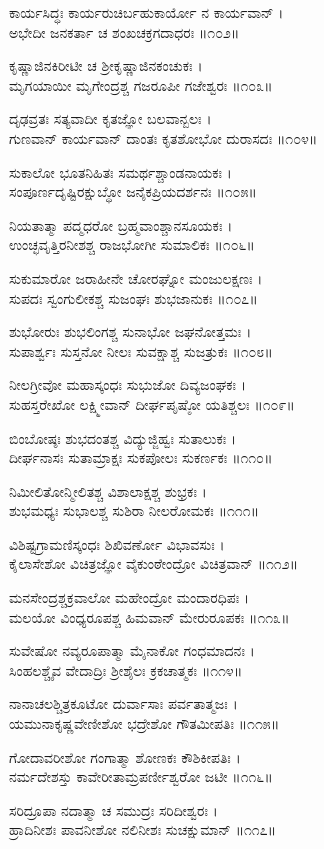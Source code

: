 ಕಾರ್ಯಸಿದ್ಧಃ ಕಾರ್ಯರುಚಿರ್ಬಹುಕಾರ್ಯೋ ನ ಕಾರ್ಯವಾನ್ ।\\
ಅಭೇದೀ ಜನಕರ್ತಾ ಚ ಶಂಖಚಕ್ರಗದಾಧರಃ ॥೧೦೨॥

ಕೃಷ್ಣಾಜಿನಕಿರೀಟೀ ಚ ಶ್ರೀಕೃಷ್ಣಾಜಿನಕಂಚುಕಃ ।\\
ಮೃಗಯಾಯೀ ಮೃಗೇಂದ್ರಶ್ಚ ಗಜರೂಪೀ ಗಜೇಶ್ವರಃ ॥೧೦೩॥

ದೃಢವ್ರತಃ ಸತ್ಯವಾದೀ ಕೃತಜ್ಞೋ ಬಲವಾನ್ಬಲಃ ।\\
ಗುಣವಾನ್ ಕಾರ್ಯವಾನ್ ದಾಂತಃ ಕೃತಶೋಭೋ ದುರಾಸದಃ ॥೧೦೪॥

ಸುಕಾಲೋ ಭೂತನಿಹಿತಃ ಸಮರ್ಥಶ್ಚಾಂಡನಾಯಕಃ ।\\
ಸಂಪೂರ್ಣದೃಷ್ಟಿರಕ್ಷುಬ್ಧೋ ಜನೈಕಪ್ರಿಯದರ್ಶನಃ ॥೧೦೫॥

ನಿಯತಾತ್ಮಾ ಪದ್ಮಧರೋ ಬ್ರಹ್ಮವಾಂಶ್ಚಾನಸೂಯಕಃ ।\\
ಉಂಚ್ಛವೃತ್ತಿರನೀಶಶ್ಚ ರಾಜಭೋಗೀ ಸುಮಾಲಿಕಃ ॥೧೦೬॥

ಸುಕುಮಾರೋ ಜರಾಹೀನೇ ಚೋರಘ್ನೋ ಮಂಜುಲಕ್ಷಣಃ ।\\
ಸುಪದಃ ಸ್ವಂಗುಲೀಕಶ್ಚ ಸುಜಂಘಃ ಶುಭಜಾನುಕಃ ॥೧೦೭॥

ಶುಭೋರುಃ ಶುಭಲಿಂಗಶ್ಚ ಸುನಾಭೋ ಜಘನೋತ್ತಮಃ ।\\
ಸುಪಾರ್ಶ್ವಃ ಸುಸ್ತನೋ ನೀಲಃ ಸುವಕ್ಷಾಶ್ಚ ಸುಜತ್ರುಕಃ ॥೧೦೮॥

ನೀಲಗ್ರೀವೋ ಮಹಾಸ್ಕಂಧಃ ಸುಭುಜೋ ದಿವ್ಯಜಂಘಕಃ ।\\
ಸುಹಸ್ತರೇಖೋ ಲಕ್ಷ್ಮೀವಾನ್ ದೀರ್ಘಪೃಷ್ಠೋ ಯತಿಶ್ಚಲಃ ॥೧೦೯॥

ಬಿಂಬೋಷ್ಠಃ ಶುಭದಂತಶ್ಚ ವಿದ್ಯುಜ್ಜಿಹ್ವಃ ಸುತಾಲುಕಃ ।\\
ದೀರ್ಘನಾಸಃ ಸುತಾಮ್ರಾಕ್ಷಃ ಸುಕಪೋಲಃ ಸುಕರ್ಣಕಃ ॥೧೧೦॥

ನಿಮೀಲಿತೋನ್ಮೀಲಿತಶ್ಚ ವಿಶಾಲಾಕ್ಷಶ್ಚ ಶುಭ್ರಕಃ ।\\
ಶುಭಮಧ್ಯಃ ಸುಭಾಲಶ್ಚ ಸುಶಿರಾ ನೀಲರೋಮಕಃ ॥೧೧೧॥

ವಿಶಿಷ್ಟಗ್ರಾಮಣಿಸ್ಕಂಧಃ ಶಿಖಿವರ್ಣೋ ವಿಭಾವಸುಃ ।\\
ಕೈಲಾಸೇಶೋ ವಿಚಿತ್ರಜ್ಞೋ ವೈಕುಂಠೇಂದ್ರೋ ವಿಚಿತ್ರವಾನ್ ॥೧೧೨॥

ಮನಸೇಂದ್ರಶ್ಚಕ್ರವಾಲೋ ಮಹೇಂದ್ರೋ ಮಂದಾರಧಿಪಃ ।\\
ಮಲಯೋ ವಿಂಧ್ಯರೂಪಶ್ಚ ಹಿಮವಾನ್ ಮೇರುರೂಪಕಃ ॥೧೧೩॥

ಸುವೇಷೋ ನವ್ಯರೂಪಾತ್ಮಾ ಮೈನಾಕೋ ಗಂಧಮಾದನಃ ।\\
ಸಿಂಹಲಶ್ಚೈವ ವೇದಾದ್ರಿಃ ಶ್ರೀಶೈಲಃ ಕ್ರಕಚಾತ್ಮಕಃ ॥೧೧೪॥

ನಾನಾಚಲಶ್ಚಿತ್ರಕೂಟೋ ದುರ್ವಾಸಾಃ ಪರ್ವತಾತ್ಮಜಃ ।\\
ಯಮುನಾಕೃಷ್ಣವೇಣೀಶೋ ಭದ್ರೇಶೋ ಗೌತಮೀಪತಿಃ ॥೧೧೫॥

ಗೋದಾವರೀಶೋ ಗಂಗಾತ್ಮಾ ಶೋಣಕಃ ಕೌಶಿಕೀಪತಿಃ ।\\
ನರ್ಮದೇಶಸ್ತು ಕಾವೇರೀತಾಮ್ರಪರ್ಣೀಶ್ವರೋ ಜಟೀ ॥೧೧೬॥

ಸರಿದ್ರೂಪಾ ನದಾತ್ಮಾ ಚ ಸಮುದ್ರಃ ಸರಿದೀಶ್ವರಃ ।\\
ಹ್ರಾದಿನೀಶಃ ಪಾವನೀಶೋ ನಲಿನೀಶಃ ಸುಚಕ್ಷುಮಾನ್ ॥೧೧೭॥

